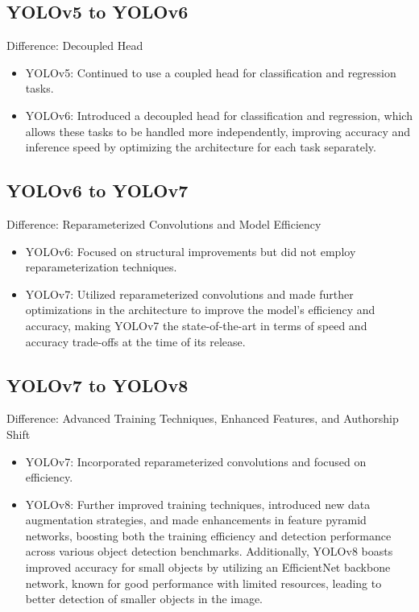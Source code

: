 \documentclass[conference]{IEEEtran}
\begin{document}
\subsection*{YOLOv5 to YOLOv6}
Difference: Decoupled Head
\begin{itemize}
  \item YOLOv5: Continued to use a coupled head for classification and regression tasks.
  \item YOLOv6: Introduced a decoupled head for classification and regression, which allows these tasks to be handled more independently, improving accuracy and inference speed by optimizing the architecture for each task separately.
\end{itemize}

\subsection*{YOLOv6 to YOLOv7}
Difference: Reparameterized Convolutions and Model Efficiency
\begin{itemize}
  \item YOLOv6: Focused on structural improvements but did not employ reparameterization techniques.
  \item YOLOv7: Utilized reparameterized convolutions and made further optimizations in the architecture to improve the model's efficiency and accuracy, making YOLOv7 the state-of-the-art in terms of speed and accuracy trade-offs at the time of its release.
\end{itemize}

\subsection*{YOLOv7 to YOLOv8}
Difference: Advanced Training Techniques, Enhanced Features, and Authorship Shift
\begin{itemize}
  \item YOLOv7: Incorporated reparameterized convolutions and focused on efficiency.
  \item YOLOv8: Further improved training techniques, introduced new data augmentation strategies, and made enhancements in feature pyramid networks, boosting both the training efficiency and detection performance across various object detection benchmarks. Additionally, YOLOv8 boasts improved accuracy for small objects by utilizing an EfficientNet backbone network, known for good performance with limited resources, leading to better detection of smaller objects in the image.
\end{itemize}
\end{document}
